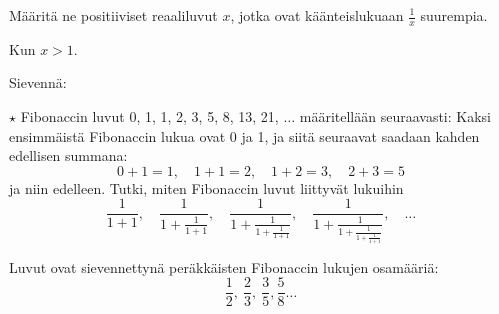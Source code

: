\begin{tehtavasivu}
\begin{tehtava}
	Määritä ne positiiviset reaaliluvut \(x\), jotka ovat käänteislukuaan $\frac{1}{x}$ suurempia.
	\begin{vastaus}
	 Kun $x>1$.
	\end{vastaus}
\end{tehtava}

\begin{tehtava}
Sievennä:
 \begin{alakohdat}
 \end{alakohdat}
 \begin{vastaus}
	\begin{alakohdat}
	\end{alakohdat}
 \end{vastaus}


\end{tehtava}

\begin{tehtava}
	$\star$ Fibonaccin luvut 0, 1, 1, 2, 3, 5, 8, 13, 21, $\ldots$ määritellään seuraavasti: Kaksi ensimmäistä
	Fibonaccin lukua ovat 0 ja 1, ja siitä seuraavat saadaan kahden
	edellisen summana: \[ 0+1=1, \quad 1+1=2, \quad 1+2 = 3, \quad 2+3=5 \] 
	ja niin edelleen. 
	Tutki, miten Fibonaccin luvut liittyvät lukuihin
	\[ \frac{1}{1+1}, \quad \frac{1}{1+\frac{1}{1+1}}, \quad
	\frac{1}{1+\frac{1}{1+\frac{1}{1+1}}}, \quad 
	\frac{1}{1+\frac{1}{1+\frac{1}{1+\frac{1}{1+1}}}}, \quad \ldots\]
	\begin{vastaus}
		Luvut ovat sievennettynä peräkkäisten Fibonaccin
		lukujen osamääriä:
		\[\frac{1}{2}, \ \frac{2}{3}, \ \frac{3}{5}, \frac{5}{8} \ldots  \]
	\end{vastaus}
\end{tehtava}


\end{tehtavasivu}

